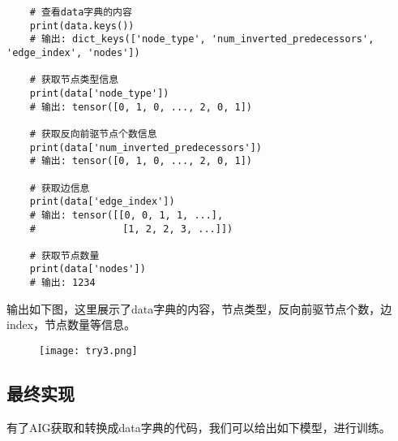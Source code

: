 \documentclass[UTF8]{ctexart}
\begin{document}
\begin{lstlisting}
    # 查看data字典的内容
    print(data.keys())
    # 输出: dict_keys(['node_type', 'num_inverted_predecessors', 'edge_index', 'nodes'])
    
    # 获取节点类型信息
    print(data['node_type'])
    # 输出: tensor([0, 1, 0, ..., 2, 0, 1])
    
    # 获取反向前驱节点个数信息 
    print(data['num_inverted_predecessors'])
    # 输出: tensor([0, 1, 0, ..., 2, 0, 1])
    
    # 获取边信息
    print(data['edge_index'])
    # 输出: tensor([[0, 0, 1, 1, ...], 
    #               [1, 2, 2, 3, ...]])
    
    # 获取节点数量
    print(data['nodes'])
    # 输出: 1234
\end{lstlisting}
输出如下图，这里展示了data字典的内容，节点类型，反向前驱节点个数，边index，节点数量等信息。
\begin{figure}[H]
    \centering
    \texttt{[image: try3.png]}
    
    \caption{}
    \label{fig:try3}
\end{figure}\par

\subsection{最终实现}
有了AIG获取和转换成data字典的代码，我们可以给出如下模型，进行训练。
\end{document}
